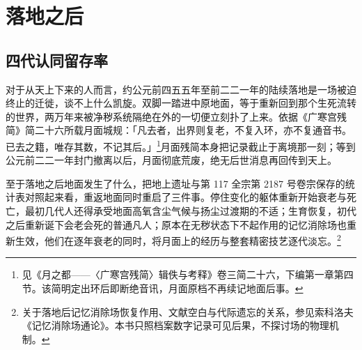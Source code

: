 \chapter{落地之后}


\section{四代认同留存率}

对于从天上下来的人而言，约公元前四五五年至前二二一年的陆续落地是一场被迫终止的迁徙，谈不上什么凯旋。双脚一踏进中原地面，等于重新回到那个生死流转的世界，两万年来被净秽系统隔绝在外的一切便立刻扑了上来。依据《广寒宫残简》简二十六所载月面城规：「凡去者，出界则复老，不复入环，亦不复通音书。已去之籍，唯存其数，不记其后。」\footnote{见《月之都——〈广寒宫残简〉辑佚与考释》卷三简二十六，下编第一章第四节。该简明定出环后即断绝音讯，月面原档不再续记地面后事。}月面残简本身把记录截止于离境那一刻；等到公元前二二一年封门撤离以后，月面彻底荒废，绝无后世消息再回传到天上。

至于落地之后地面发生了什么，把地上遗址与第 117 全宗第 2187 号卷宗保存的统计表对照起来看，重返地面同时重启了三件事。停住变化的躯体重新开始衰老与死亡，最初几代人还得承受地面高氧含尘气候与扬尘过渡期的不适；生育恢复，初代之后重新诞下会老会死的普通凡人；原本在无秽状态下不起作用的记忆消除场也重新生效，他们在逐年衰老的同时，将月面上的经历与整套精密技艺逐代淡忘。\footnote{关于落地后记忆消除场恢复作用、文献空白与代际遗忘的关系，参见索科洛夫《记忆消除场通论》。本书只照档案数字记录可见后果，不探讨场的物理机制。}

